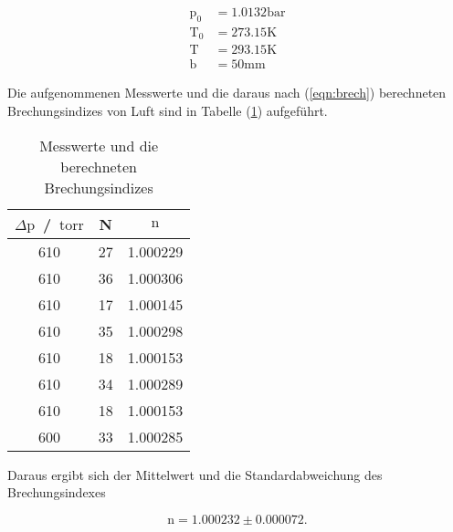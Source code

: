 \begin{align*}
\text{p}_0 &= 1.0132 \si{\bar}\\
\text{T}_0 &= 273.15 \si{\kelvin}\\
\text{T} &= 293.15 \si{\kelvin}\\
\text{b} &= 50 \si{\milli\meter}
\end{align*}

\noindent
Die aufgenommenen Messwerte und die daraus nach (\ref{eqn:brech}) berechneten Brechungsindizes von Luft sind in Tabelle (\ref{tab:n}) aufgeführt.

\newpage
\begin{table}
  \centering
  \caption{Messwerte und die berechneten Brechungsindizes}
  \label{tab:n}
  \begin{tabular}{c c c}
  \toprule
  $ \Delta \text{p}$ \,/\, $\text{torr} $ & N & $\text{n}$\\
  \midrule 
 
    610 & 27 & 1.000229 \\
    610 & 36 & 1.000306 \\
    610 & 17 & 1.000145 \\
    610 & 35 & 1.000298 \\
    610 & 18 & 1.000153 \\
    610 & 34 & 1.000289 \\
    610 & 18 & 1.000153 \\
    600 & 33 & 1.000285 \\

  \bottomrule
  \end{tabular}
\end{table}

\noindent
Daraus ergibt sich der Mittelwert und die Standardabweichung des Brechungsindexes

\begin{equation*}
\text{n} = 1.000232 \pm 0.000072.
\end{equation*}
